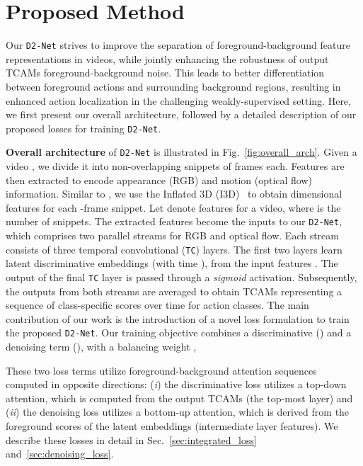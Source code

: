 \documentclass[final]{cvpr}
\def\proposed{\texttt{D2-Net}{}}
\begin{document}
\section{Proposed Method\label{sec:method}}
Our \proposed{} strives to improve the separation of foreground-background feature representations in videos, while jointly enhancing the robustness of output TCAMs \wrt foreground-background noise.
This leads to better differentiation between foreground actions and surrounding background regions, resulting in enhanced action localization in the challenging weakly-supervised setting.
Here, we first present our overall architecture, followed by a detailed description of our proposed losses for training \proposed. 

\noindent\textbf{Overall architecture} of \proposed{} is illustrated in Fig.~\ref{fig:overall_arch}. Given a video , we divide it into non-overlapping snippets of  frames each. Features are then extracted to encode appearance (RGB) and motion (optical flow) information. Similar to \cite{stpn,wtalc,3cnet}, we use the Inflated 3D (I3D)~\cite{kinetics} to obtain  dimensional features for each -frame snippet. Let  denote features for a video, where  is the number of snippets. The extracted features become the inputs to our \proposed{}, which comprises two parallel streams for RGB and optical flow. Each stream consists of three temporal convolutional (\texttt{TC}) layers. The first two layers learn latent discriminative embeddings  (with time ), from the input features . The output of the final \texttt{TC} layer is passed through a \textit{sigmoid} activation. Subsequently, the outputs from both streams are averaged to obtain TCAMs  representing a sequence of class-specific scores over time for  action classes. 
The main contribution of our work is the introduction of a novel loss formulation to train the proposed \proposed. 
Our training objective combines a discriminative () and a denoising term (), with a balancing weight ,

These two loss terms utilize foreground-background attention sequences computed in opposite directions: (\textit{i}) the discriminative loss  utilizes a top-down attention, which is computed from the output TCAMs (the top-most layer) and (\textit{ii}) the denoising loss  utilizes a bottom-up attention, which is derived from the foreground scores of the latent embeddings (intermediate layer features). 
We describe these losses in detail in Sec.~\ref{sec:integrated_loss} and~\ref{sec:denoising_loss}.
\end{document}
